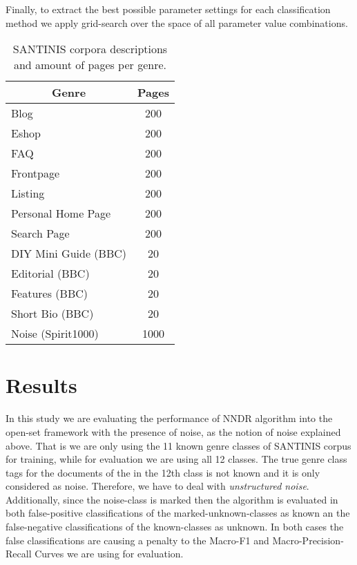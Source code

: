 Finally, to extract the best possible parameter settings for each classification method we apply grid-search over the space of all parameter value combinations.

\begin{table}
\center
\begin{tabular}{|l|l|}
\hline
\multicolumn{1}{|c|}{Genre} & \multicolumn{1}{c|}{Pages} \\
\hline
\multicolumn{1}{|l|}{Blog} & \multicolumn{1}{c|}{200}  \\
\multicolumn{1}{|l|}{Eshop} & \multicolumn{1}{c|}{200} \\
\multicolumn{1}{|l|}{FAQ} & \multicolumn{1}{c|}{200} \\
\multicolumn{1}{|l|}{Frontpage} & \multicolumn{1}{c|}{200} \\
\multicolumn{1}{|l|}{Listing} & \multicolumn{1}{c|}{200} \\
\multicolumn{1}{|l|}{Personal Home Page} & \multicolumn{1}{c|}{200} \\
\multicolumn{1}{|l|}{Search Page} & \multicolumn{1}{c|}{200} \\
\multicolumn{1}{|l|}{DIY Mini Guide (BBC)} & \multicolumn{1}{c|}{20} \\
\multicolumn{1}{|l|}{Editorial (BBC)} & \multicolumn{1}{c|}{20} \\
\multicolumn{1}{|l|}{Features (BBC)} & \multicolumn{1}{c|}{20} \\
\multicolumn{1}{|l|}{Short Bio (BBC)} & \multicolumn{1}{c|}{20} \\
\multicolumn{1}{|l|}{Noise (Spirit1000)} & \multicolumn{1}{c|}{1000}  \\
\hline
\end{tabular}
\caption {SANTINIS corpora descriptions and amount of pages per genre.}
\label{tbl:genre_tags}
\end{table}


\section{Results}\label{sec:Experiments_Results}

In this study we are evaluating the performance of NNDR algorithm into the open-set framework with the presence of noise, as the notion of noise explained above. That is we are only using the 11 known genre classes of SANTINIS corpus for training, while for evaluation we are using all 12 classes. The true genre class tags for the documents of the in the 12th class is not known and it is only considered as noise. Therefore, we have to deal with \textit{unstructured noise}. Additionally, since the noise-class is marked then the algorithm is evaluated in both false-positive classifications of the marked-unknown-classes as known an the false-negative classifications of the known-classes as unknown. In both cases the false classifications are causing a penalty to the Macro-F1 and Macro-Precision-Recall Curves we are using for evaluation.

